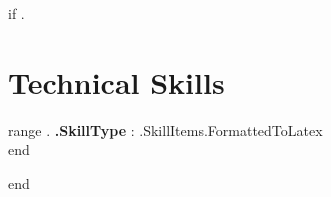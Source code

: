{{if .}}
\section{Technical Skills}
\begin{itemize}[leftmargin=0.15in, label={}]
    \small{\item{
        {{range .}} \textbf{ {{.SkillType}} }{: {{.SkillItems.FormattedToLatex}}} \\
        {{end}}
    }}
\end{itemize}
\vspace{-15pt}
{{end}}